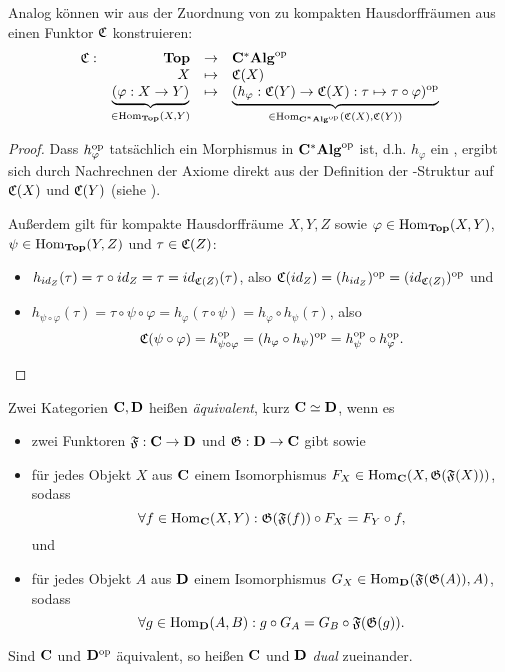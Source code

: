 \begin{bsp}\label{bsp:FunktorC}
Analog können wir aus der Zuordnung von \CAlgn{} zu kompakten Hausdorffräumen aus   einen Funktor $\mathfrak{C}$ konstruieren:
\[ \begin{array}{@{}rrcl@{}}
	\stetig: 	&\KatTop			&\to 		&\KatCAlg^\op													\\
				&X					&\mapsto 	&\stetig(X)													\\				
				&\underbrace{(\varphi:X \to Y)}_{\in \Hom_{\KatTop}(X,Y)} 	&\mapsto	
				&\underbrace{(h_\varphi: \stetig(Y) \to \stetig(X): \tau \mapsto \tau \circ \varphi)^\op}_{\in \Hom_{\KatCAlg^\op}(\stetig(X),\stetig(Y))}
\end{array} \]
\end{bsp}

\begin{proof}Dass $h_\varphi^{\mathrm{op}}$ tatsächlich ein Morphismus in $\mathbf{C^*Alg}^{\mathrm{op}}$ ist, d.h. $h_\varphi$ ein \CAlgHom{}, ergibt sich durch Nachrechnen der Axiome direkt aus der Definition der \CAlg-Struktur auf $\mathfrak{C}(X)$ und $\mathfrak{C}(Y)$ (siehe ).

Außerdem gilt für kompakte Hausdorffräume $X, Y, Z$ sowie $\varphi \in \mathrm{Hom}_{\mathbf{Top}}(X,Y)$, $\psi \in \mathrm{Hom}_{\mathbf{Top}}(Y,Z)$ und $\tau \in \mathfrak{C}(Z)$:
\begin{itemize}
	\item $h_{id_Z}(\tau) = \tau \circ id_Z = \tau = id_{\mathfrak{C}(Z)}(\tau)$, also $\mathfrak{C}(id_Z) = (h_{id_Z})^{\mathrm{op}} = (id_{\mathfrak{C}(Z)})^{\mathrm{op}}$ und
	\item $h_{\psi\circ \varphi}(\tau) = \tau\circ \psi \circ \varphi = h_\varphi(\tau\circ\psi) = h_\varphi \circ h_\psi(\tau)$, also 
		\[\mathfrak{C}(\psi \circ \varphi) = h_{\psi \circ \varphi}^{\mathrm{op}} = (h_\varphi \circ h_\psi)^{\mathrm{op}} = h_\psi^{\mathrm{op}} \circ h_\varphi^{\mathrm{op}}.\]
\end{itemize}
\end{proof}

\begin{defn}[Kategorienäquivalenz]\label{defn:KatAEquiv}
Zwei Kategorien $\mathbf{C}, \mathbf{D}$ heißen \emph{äquivalent}, kurz $\mathbf{C} \simeq \mathbf{D}$, wenn es 
\begin{itemize}
	\item zwei Funktoren $\mathfrak{F}: \mathbf{C} \to \mathbf{D}$ und $\mathfrak{G}:\mathbf{D} \to \mathbf{C}$ gibt sowie
	\item für jedes Objekt $X$ aus $\mathbf{C}$ einem Isomorphismus $F_X \in \mathrm{Hom}_{\mathbf{C}}(X, \mathfrak{G}(\mathfrak{F}(X)))$, sodass
		\[\forall f \in \mathrm{Hom}_{\mathbf{C}}(X,Y): \mathfrak{G}(\mathfrak{F}(f))\circ F_X = F_Y \circ f,\]
	 und
	\item für jedes Objekt $A$ aus $\mathbf{D}$ einem Isomorphismus $G_X \in \mathrm{Hom}_{\mathbf{D}}(\mathfrak{F}(\mathfrak{G}(A)), A)$, sodass	
		\[\forall g \in \mathrm{Hom}_{\mathbf{D}}(A,B): g\circ G_A = G_B \circ \mathfrak{F}(\mathfrak{G}(g)).\]
\end{itemize}

Sind $\mathbf{C}$ und $\mathbf{D}^{\mathrm{op}}$ äquivalent, so heißen $\mathbf{C}$ und $\mathbf{D}$ \emph{dual} zueinander.
\end{defn}

